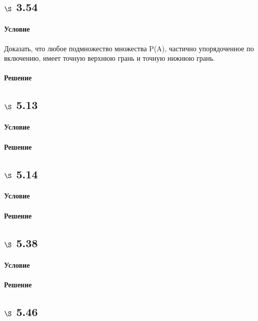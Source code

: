 \documentclass[a4paper,12pt]{article}
\begin{document}
\subsection*{$\S$ 3.54}
\paragraph*{Условие} Доказать, что любое подмножество множества P(A), частично упорядоченное по включению, имеет точную верхнюю грань и точную нижнюю грань.
\paragraph*{Решение}

\subsection*{$\S$ 5.13}
\paragraph*{Условие}
\paragraph*{Решение}

\subsection*{$\S$ 5.14}
\paragraph*{Условие}
\paragraph*{Решение}

\subsection*{$\S$ 5.38}
\paragraph*{Условие}
\paragraph*{Решение}

\subsection*{$\S$ 5.46}
\end{document}
